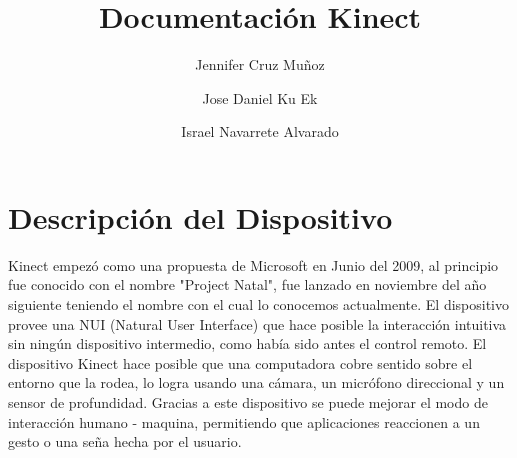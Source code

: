 \documentclass[11pt,a4paper]{article}
\author{Jennifer Cruz Muñoz \and Jose Daniel Ku Ek \and Israel Navarrete Alvarado}
\title{Documentación Kinect}
\begin{document}
\maketitle
\newpage
\tableofcontents
\newpage
\section{Descripción del Dispositivo}
Kinect empezó como una propuesta de Microsoft en Junio del 2009, al principio fue conocido con el nombre "Project Natal", fue lanzado en noviembre del año siguiente teniendo el nombre con el cual lo conocemos actualmente. El dispositivo provee una NUI (Natural User Interface) que hace posible la interacción intuitiva sin ningún dispositivo intermedio, como había sido antes el control remoto. 
El dispositivo Kinect hace posible que una computadora cobre sentido sobre el entorno que la rodea, lo logra usando una cámara, un micrófono direccional y un sensor de profundidad. Gracias a este dispositivo se puede mejorar el modo de interacción humano - maquina, permitiendo que aplicaciones reaccionen a un gesto o una seña hecha por el usuario.
\end{document}
